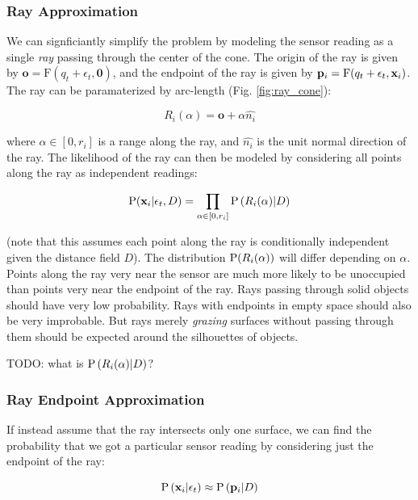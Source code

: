 \documentclass{article}
\begin{document}
\subsubsection{Ray Approximation}
 We can signficiantly simplify the problem by modeling the sensor reading as a single \textit{ray} passing through the center of the cone. The origin of the ray is given by $ \mathbf{o} = \text{F}(q_t +
\epsilon_t, \mathbf{0})$, and the endpoint of the ray is given by $\mathbf{p}_i =\text{F}(q_t + \epsilon_t, \mathbf{x}_i)$.  The ray can be paramaterized by arc-length (Fig. \ref{fig:ray_cone}):

\begin{equation}
R_i(\alpha) = \mathbf{o} + \alpha \hat{n_i}  
\end{equation}

\noindent where $\alpha \in [0, r_i]$ is a range along the ray, and $\hat{n_i}$ is the unit normal direction of the ray. The likelihood of the ray can then be modeled by considering all points along the ray as independent readings:

\begin{equation}
\text{P}(\mathbf{x}_i | \epsilon_t, D) = \prod_{\alpha \in [0, r_i]} \text{P}\left(R_i(\alpha) | D\right) 
\end{equation}

\noindent (note that this assumes each point along the ray is conditionally independent given the distance field $D$).  The distribution $\text{P}(R_i(\alpha))$ will differ depending on $\alpha$. Points along the ray very near the sensor are much more
likely to be unoccupied than points very near the endpoint of the ray. Rays passing through solid objects should have very low probability. Rays with endpoints in empty space should also be very improbable. But rays merely \textit{grazing} surfaces
without passing through them should be expected around the silhouettes of objects. 

TODO: what is $\text{P}\left(R_i(\alpha) | D\right) $?

\subsubsection{Ray Endpoint Approximation} 
If instead assume that the ray intersects only one surface, we can find the probability that we got a particular sensor reading by considering just the endpoint of the ray:

\begin{equation}
\text{P}\left( \mathbf{x}_i | \epsilon_t \right) \approx \text{P} \left(\mathbf{p}_i | D \right)
\end{equation}
\end{document}
